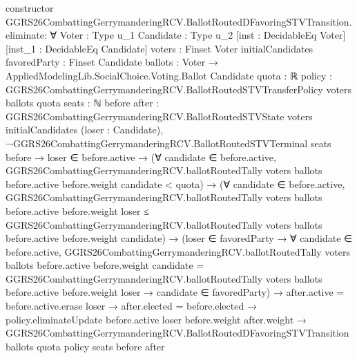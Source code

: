 \documentclass[10pt]{article}
\begin{document}
\begin{ReviewVerbatim}
constructor GGRS26CombattingGerrymanderingRCV.BallotRoutedDFavoringSTVTransition.eliminate:
∀ {Voter : Type u_1} {Candidate : Type u_2} [inst : DecidableEq Voter] [inst_1 : DecidableEq Candidate]
  {voters : Finset Voter} {initialCandidates favoredParty : Finset Candidate}
  {ballots : Voter → AppliedModelingLib.SocialChoice.Voting.Ballot Candidate} {quota : ℝ}
  {policy : GGRS26CombattingGerrymanderingRCV.BallotRoutedSTVTransferPolicy voters ballots quota} {seats : ℕ}
  {before after : GGRS26CombattingGerrymanderingRCV.BallotRoutedSTVState voters initialCandidates} (loser : Candidate),
  ¬GGRS26CombattingGerrymanderingRCV.BallotRoutedSTVTerminal seats before →
    loser ∈ before.active →
      (∀ candidate ∈ before.active,
          GGRS26CombattingGerrymanderingRCV.ballotRoutedTally voters ballots before.active before.weight candidate <
            quota) →
        (∀ candidate ∈ before.active,
            GGRS26CombattingGerrymanderingRCV.ballotRoutedTally voters ballots before.active before.weight loser ≤
              GGRS26CombattingGerrymanderingRCV.ballotRoutedTally voters ballots before.active before.weight
                candidate) →
          (loser ∈ favoredParty →
              ∀ candidate ∈ before.active,
                GGRS26CombattingGerrymanderingRCV.ballotRoutedTally voters ballots before.active before.weight
                      candidate =
                    GGRS26CombattingGerrymanderingRCV.ballotRoutedTally voters ballots before.active before.weight
                      loser →
                  candidate ∈ favoredParty) →
            after.active = before.active.erase loser →
              after.elected = before.elected →
                policy.eliminateUpdate before.active loser before.weight after.weight →
                  GGRS26CombattingGerrymanderingRCV.BallotRoutedDFavoringSTVTransition ballots quota policy seats before
                    after
\end{ReviewVerbatim}
\end{document}
